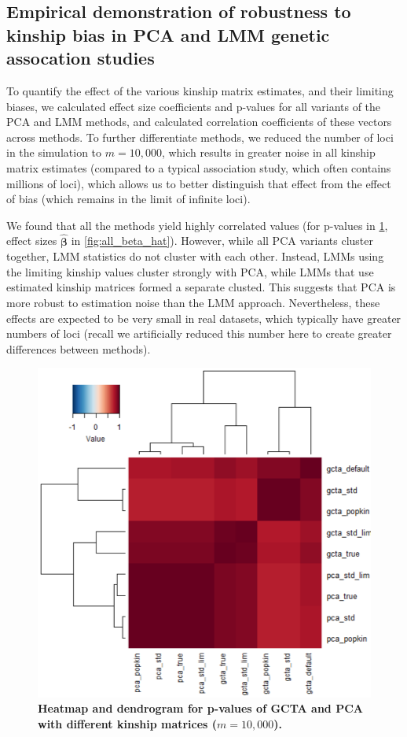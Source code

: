 \documentclass[11pt]{article}
\begin{document}
\subsection{Empirical demonstration of robustness to kinship bias in PCA and LMM genetic assocation studies}

To quantify the effect of the various kinship matrix estimates, and their limiting biases, we calculated effect size coefficients and p-values for all variants of the PCA and LMM methods, and calculated correlation coefficients of these vectors across methods.
To further differentiate methods, we reduced the number of loci in the simulation to $m=10,000$, which results in greater noise in all kinship matrix estimates (compared to a typical association study, which often contains millions of loci), which allows us to better distinguish that effect from the effect of bias (which remains in the limit of infinite loci).

We found that all the methods yield highly correlated values (for p-values in \cref{fig:all_pval}, effect sizes $\hat{\mathbf{\beta}}$ in \cref{fig:all_beta_hat}).
However, while all PCA variants cluster together, LMM statistics do not cluster with each other.
Instead, LMMs using the limiting kinship values cluster strongly with PCA, while LMMs that use estimated kinship matrices formed a separate clusted.
This suggests that PCA is more robust to estimation noise than the LMM approach.
Nevertheless, these effects are expected to be very small in real datasets, which typically have greater numbers of loci (recall we artificially reduced this number here to create greater differences between methods).

\begin{figure}[bp!]
  \centering
  \includegraphics[width=6in]{all_pval.pdf}
  \caption{
    {\bf Heatmap and dendrogram for p-values of GCTA and PCA with different kinship matrices ($m=10,000$).}
  }
  \label{fig:all_pval}
\end{figure}
\end{document}
